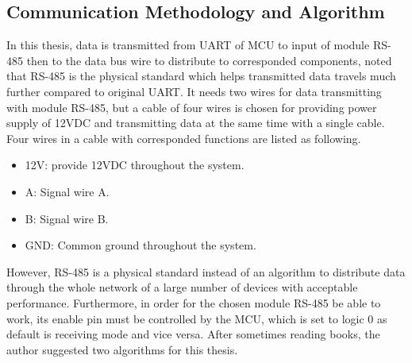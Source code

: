     \subsection{Communication Methodology and Algorithm}
    In this thesis, data is transmitted from UART of MCU to input of module RS-485 then to the data bus wire to distribute to corresponded components, noted that RS-485 is the physical standard which helps transmitted data travels much further compared to original UART. It needs two wires for data transmitting with module RS-485, but a cable of four wires is chosen for providing power supply of 12VDC and transmitting data at the same time with a single cable. Four wires in a cable with corresponded functions are listed as following.
    \begin{itemize}
    \item 12V: provide 12VDC throughout the system.
    \item A: Signal wire A.
    \item B: Signal wire B.
    \item GND: Common ground throughout the system.
    \end{itemize}

    However, RS-485 is a physical standard instead of an algorithm to distribute data through the whole network of a large number of devices with acceptable performance. Furthermore, in order for the chosen module RS-485 be able to work, its enable pin must be controlled by the MCU, which is set to logic 0 as default is receiving mode and vice versa. After sometimes reading books, the author suggested two algorithms for this thesis.
